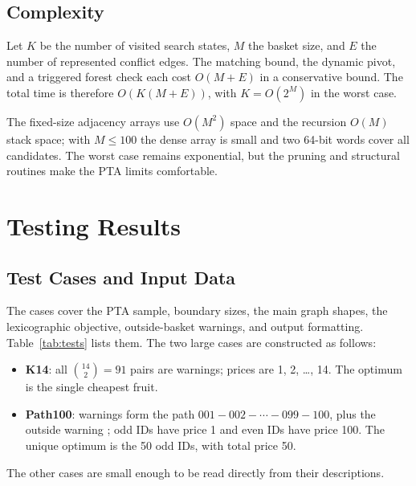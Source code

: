 \documentclass[12pt,a4paper]{report}
\newcommand{\code}[1]{\texttt{\detokenize{#1}}}
\begin{document}
\section{Complexity}

Let $K$ be the number of visited search states, $M$ the basket size, and $E$
the number of represented conflict edges.  The matching bound, the dynamic
pivot, and a triggered forest check each cost $O(M+E)$ in a conservative bound.
The total time is therefore $O(K(M+E))$, with $K=O(2^M)$ in the worst case.

The fixed-size adjacency arrays use $O(M^2)$ space and the recursion $O(M)$ stack space;
with $M\le100$ the dense array is small and two 64-bit words cover all
candidates.  The worst case remains exponential, but the pruning and structural
routines make the PTA limits comfortable.

\chapter{Testing Results}\label{ch:testing}
\section{Test Cases and Input Data}

The cases cover the PTA sample, boundary sizes, the main graph shapes, the
lexicographic objective, outside-basket warnings, and output formatting.
Table~\ref{tab:tests} lists them.  The two large cases are constructed as
follows:
\begin{itemize}
\item \textbf{K14}: all $\binom{14}{2}=91$ pairs are warnings; prices are
      1, 2, \ldots, 14.  The optimum is the single cheapest fruit.
\item \textbf{Path100}: warnings form the path
      $001-002-\cdots-099-100$, plus the outside warning \code{001 999};
      odd IDs have price 1 and even IDs have price 100.  The unique optimum is
      the 50 odd IDs, with total price 50.
\end{itemize}
The other cases are small enough to be read directly from their descriptions.
\end{document}

